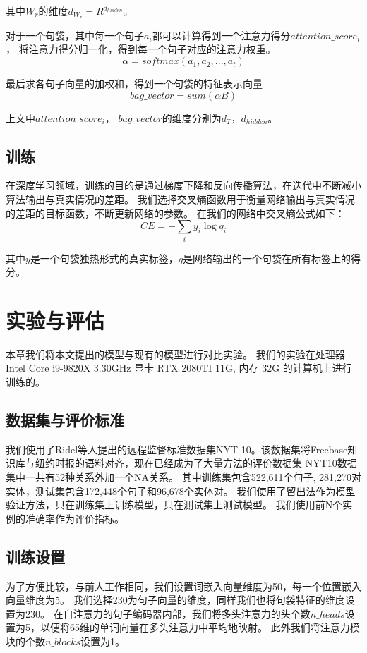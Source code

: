 \documentclass[UTF8]{csoarticle}
\begin{document}
其中$W_r$的维度$d_{W_r} = R^{d_{hidden}}$。

对于一个句袋，其中每一个句子$a_i$都可以计算得到一个注意力得分$attention\_score_i$，
将注意力得分归一化，得到每一个句子对应的注意力权重。
\[\alpha = softmax({a_1,a_2,...,a_t})\]

最后求各句子向量的加权和，得到一个句袋的特征表示向量
\[bag\_vector = sum(\alpha  B)\]

上文中$attention\_score_i$， $bag\_vector$的维度分别为$d_T$，$d_{hidden}$。

\subsection{训练}
在深度学习领域，训练的目的是通过梯度下降和反向传播算法，在迭代中不断减小算法输出与真实情况的差距。
我们选择交叉熵函数用于衡量网络输出与真实情况的差距的目标函数，不断更新网络的参数。
在我们的网络中交叉熵公式如下：
\[ CE =-\sum _{i}y_i \log q_i\]

其中$y$是一个句袋独热形式的真实标签，$q$是网络输出的一个句袋在所有标签上的得分。
\section{实验与评估}
本章我们将本文提出的模型与现有的模型进行对比实验。
我们的实验在处理器 Intel Core i9-9820X 3.30GHz 显卡 RTX 2080TI 11G, 内存 32G 的计算机上进行训练的。

\subsection{数据集与评价标准}
我们使用了Ridel\cite{bib2}等人提出的远程监督标准数据集NYT-10。该数据集将Freebase知识库与纽约时报的语料对齐，现在已经成为了大量方法的评价数据集
NYT10数据集中一共有52种关系外加一个NA关系。
其中训练集包含522,611个句子, 281,270对实体，测试集包含172,448个句子和96,678个实体对。
我们使用了留出法作为模型验证方法，只在训练集上训练模型，只在测试集上测试模型。
我们使用前N个实例的准确率作为评价指标。

\subsection{训练设置}
为了方便比较，与前人工作\cite{bib3, bib4}相同，我们设置词嵌入向量维度为50，每一个位置嵌入向量维度为5。
我们选择230为句子向量的维度，同样我们也将句袋特征的维度设置为230。
在自注意力的句子编码器内部，我们将多头注意力的头个数$n\_heads$设置为5，以便将65维的单词向量在多头注意力中平均地映射。
此外我们将注意力模块的个数$n\_blocks$设置为1。
\end{document}
